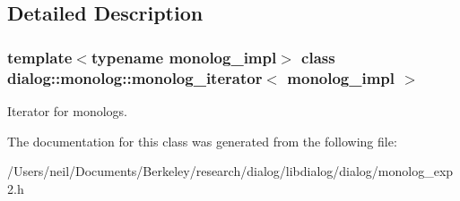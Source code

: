 \subsection{Detailed Description}
\subsubsection*{template$<$typename monolog\+\_\+impl$>$\newline
class dialog\+::monolog\+::monolog\+\_\+iterator$<$ monolog\+\_\+impl $>$}

Iterator for monologs. 

The documentation for this class was generated from the following file\+:\begin{DoxyCompactItemize}
\item 
/\+Users/neil/\+Documents/\+Berkeley/research/dialog/libdialog/dialog/monolog\+\_\+exp2.\+h\end{DoxyCompactItemize}

